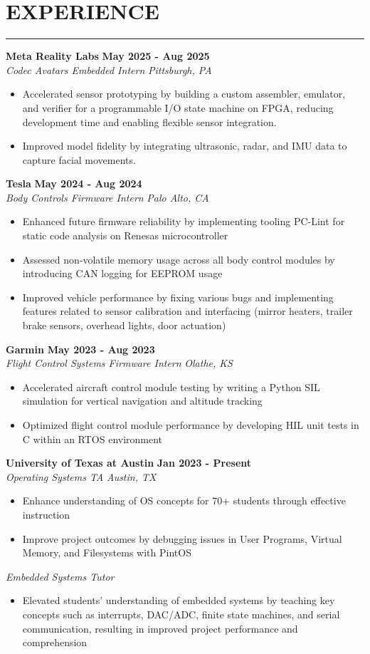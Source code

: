 \documentclass[10pt]{article}
\newcommand{\sectionHeader}[1]{%
    \vspace{-1.25\baselineskip}
    \section*{\large \MakeUppercase{#1}}
    \vspace{-1.5\baselineskip}
    \color{teal}
    \rule{\textwidth}{1.5pt} %
    \color{black}
    \vspace{-1.25\baselineskip}
    \pdfbookmark[1]{#1}{#1}
}
\newcommand{\role}[3]{
    \textit{#1} \hfill \textit{#2} \\[0pt]
    #3
}
\newcommand{\sectionItem}[5]{ %
    \textbf{#1} \hfill \textbf{#2} \\[0pt]
    \role{#3}{#4}{#5}    %
}
\begin{document}
\sectionHeader{Experience}
\begin{flushleft}
    \sectionItem{Meta Reality Labs}{May 2025 - Aug 2025}{Codec Avatars Embedded Intern}{Pittsburgh, PA}{
        \begin{itemize}
        \item Accelerated sensor prototyping by building a custom assembler, emulator, and verifier for a programmable I/O state machine on FPGA, reducing development time and enabling flexible sensor integration.
        \item Improved model fidelity by integrating ultrasonic, radar, and IMU data to capture facial movements.
        \end{itemize}
    }
    
    \sectionItem{Tesla}{May 2024 - Aug 2024}{Body Controls Firmware Intern}{Palo Alto, CA}{
        \begin{itemize}
            \item Enhanced future firmware reliability by implementing tooling PC-Lint for static code analysis on Renesas microcontroller
            \item Assessed non-volatile memory usage across all body control modules by introducing CAN logging for EEPROM usage
            \item Improved vehicle performance by fixing various bugs and implementing features related to sensor calibration and interfacing (mirror heaters, trailer brake sensors, overhead lights, door actuation)     
        \end{itemize}
    }
    
    \sectionItem{Garmin}{May 2023 - Aug 2023}{Flight Control Systems Firmware Intern}{Olathe, KS}{
        \begin{itemize}
            \item Accelerated aircraft control module testing by writing a Python SIL simulation for vertical navigation and altitude tracking
            \item Optimized flight control module performance by developing HIL unit tests in C within an RTOS environment
        \end{itemize}
    }

    \sectionItem{University of Texas at Austin}{Jan 2023 - Present}{Operating Systems TA}{Austin, TX}{
        \begin{itemize}
            \item Enhance understanding of OS concepts for 70+ students through effective instruction
            \item Improve project outcomes by debugging issues in User Programs, Virtual Memory, and Filesystems with PintOS
        \end{itemize}
        \role{Embedded Systems Tutor}{}{
            \begin{itemize}
                \item Elevated students' understanding of embedded systems by teaching key concepts such as interrupts, DAC/ADC, finite state machines, and serial communication, resulting in improved project performance and comprehension
            \end{itemize}
        }
    }


\end{flushleft}
\end{document}

